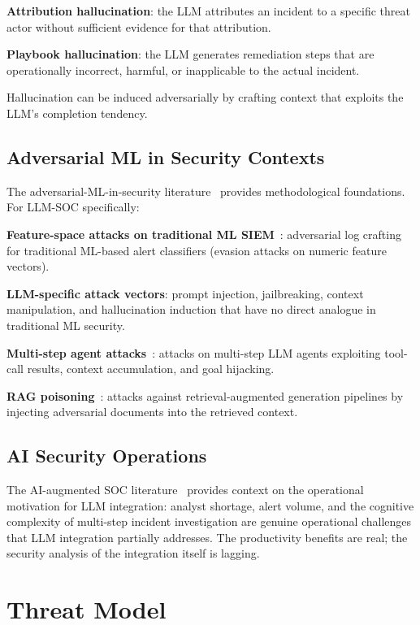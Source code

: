 \documentclass[sigconf,nonacm]{acmart}
\begin{document}
\textbf{Attribution hallucination}: the LLM attributes an
incident to a specific threat actor without sufficient evidence
for that attribution.

\textbf{Playbook hallucination}: the LLM generates
remediation steps that are operationally incorrect, harmful,
or inapplicable to the actual incident.

Hallucination can be induced adversarially by crafting context
that exploits the LLM's completion tendency.

\subsection{Adversarial ML in Security Contexts}

The adversarial-ML-in-security literature~\cite{biggio2018wild,
apruzzese2022practical,chen2024adversarialsoc} provides
methodological foundations. For LLM-SOC specifically:

\textbf{Feature-space attacks on traditional ML SIEM}~\cite{
withinpaper2024mlsiem}: adversarial log crafting for traditional
ML-based alert classifiers (evasion attacks on numeric feature
vectors).

\textbf{LLM-specific attack vectors}: prompt injection,
jailbreaking, context manipulation, and hallucination induction
that have no direct analogue in traditional ML security.

\textbf{Multi-step agent attacks}~\cite{yang2024agentattack,
yang2024multilllm}: attacks on multi-step LLM agents exploiting
tool-call results, context accumulation, and goal hijacking.

\textbf{RAG poisoning}~\cite{zou2024ragpoison}: attacks against
retrieval-augmented generation pipelines by injecting adversarial
documents into the retrieved context.

\subsection{AI Security Operations}

The AI-augmented SOC literature~\cite{hassan2024aisoc,
veerasamy2024socai,soc2024llmsurvey} provides context on the
operational motivation for LLM integration: analyst shortage,
alert volume, and the cognitive complexity of multi-step incident
investigation are genuine operational challenges that LLM
integration partially addresses. The productivity benefits are
real; the security analysis of the integration itself is lagging.

\section{Threat Model}
\end{document}
